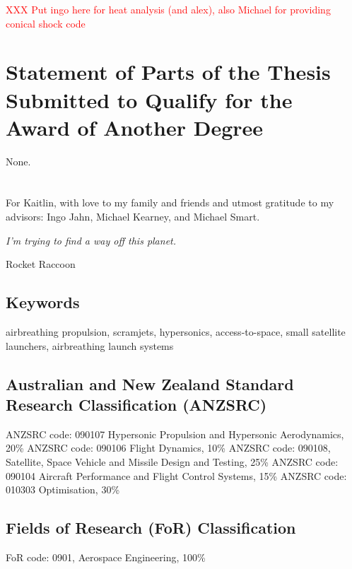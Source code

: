 \textcolor{red}{XXX Put ingo here for heat analysis (and alex), also Michael for providing conical shock code}

\section*{Statement of Parts of the Thesis Submitted to Qualify for the Award of Another Degree}

None.

\clearpage

\section*{} 
  For Kaitlin, with love to my family and friends and utmost gratitude to my advisors: Ingo Jahn, Michael Kearney, and Michael Smart. 

      \vspace*{\fill}
\begin{flushright}
	\textit{I'm trying to find a way off this planet.}
	
Rocket Raccoon
\end{flushright}
\clearpage
\subsection*{Keywords}
  airbreathing propulsion, scramjets, hypersonics, access-to-space, small satellite launchers, airbreathing launch systems

\subsection*{Australian and New Zealand Standard Research Classification (ANZSRC)}

  ANZSRC code: 090107 Hypersonic Propulsion and Hypersonic Aerodynamics, 20\% \newline
 ANZSRC code: 090106 Flight Dynamics, 10\% \newline
 ANZSRC code: 090108, Satellite, Space Vehicle and Missile Design and Testing, 25\% \newline
ANZSRC code: 090104 Aircraft Performance and Flight Control Systems, 15\% \newline
ANZSRC code: 010303 Optimisation, 30\% \newline

\subsection*{Fields of Research (FoR) Classification}

  FoR code: 0901, Aerospace Engineering, 100\%

\tableofcontents

\listoffigures
{}
\listoftables
{}
\printnomenclature
